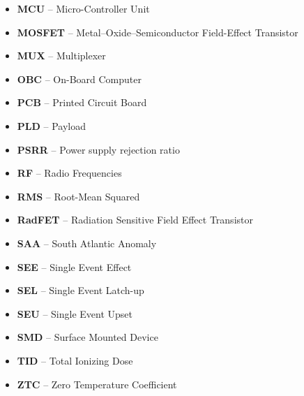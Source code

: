 \begin{itemize}
    \item    \textbf{MCU}      --    Micro-Controller Unit
    \item    \textbf{MOSFET}   --    Metal–Oxide–Semiconductor Field-Effect Transistor
    \item    \textbf{MUX}      --    Multiplexer
    \item    \textbf{OBC}      --    On-Board Computer
    \item    \textbf{PCB}      --    Printed Circuit Board
    \item    \textbf{PLD}      --    Payload
    \item    \textbf{PSRR}     --    Power supply rejection ratio
    \item    \textbf{RF}       --    Radio Frequencies
    \item    \textbf{RMS}      --    Root-Mean Squared
    \item    \textbf{RadFET}   --    Radiation Sensitive Field Effect Transistor
    \item    \textbf{SAA}      --    South Atlantic Anomaly
    \item    \textbf{SEE}      --    Single Event Effect
    \item    \textbf{SEL}      --    Single Event Latch-up
    \item    \textbf{SEU}      --    Single Event Upset
    \item    \textbf{SMD}      --    Surface Mounted Device
    \item    \textbf{TID}      --    Total Ionizing Dose
    \item    \textbf{ZTC}      --    Zero    Temperature    Coefficient
\end{itemize}
